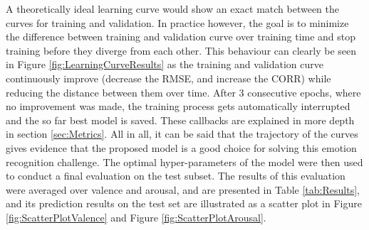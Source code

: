 \noindent A theoretically ideal learning curve would show an exact match between the curves for training and validation. In practice however, the goal is to minimize the difference between training and validation curve over training time and stop training before they diverge from each other. 
\newline\newline
This behaviour can clearly be seen in Figure \ref{fig:LearningCurveResults} as the training and validation curve continuously improve (decrease the RMSE, and increase the CORR) while reducing the distance between them over time. After 3 consecutive epochs, where no improvement was made, the training process gets automatically interrupted and the so far best model is saved. These callbacks are explained in more depth in section \ref{sec:Metrics}.
\newline\newline
All in all, it can be said that the trajectory of the curves gives evidence that the proposed model is a good choice for solving this emotion recognition challenge. The optimal hyper-parameters of the model were then used to conduct a final evaluation on the test subset. The results of this evaluation were averaged over valence and arousal, and are presented in Table \ref{tab:Results}, and its prediction results on the test set are illustrated as a scatter plot in Figure \ref{fig:ScatterPlotValence} and Figure \ref{fig:ScatterPlotArousal}.
\newline

